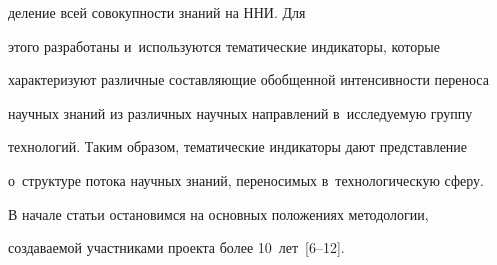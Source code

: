 деление всей совокупности знаний на ННИ. Для 


этого разработаны и~используются тематические индикаторы, которые 


характеризуют различные составляющие обобщенной интенсивности переноса 


научных знаний из различных научных направлений в~исследуемую группу 


технологий. Таким образом, тематические индикаторы дают пред\-став\-ле\-ние 


о~структуре потока научных знаний, переносимых в~технологическую сферу.


     


     В начале статьи остановимся на основных положениях методологии, 


создаваемой участниками проекта более 10~лет~[6--12].


